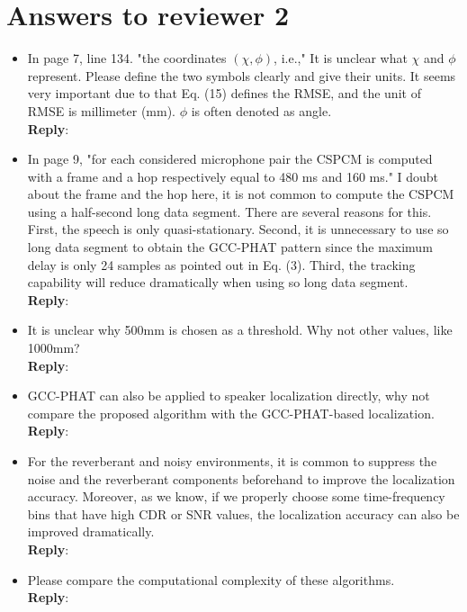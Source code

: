 \documentclass[11pt, technote, letterpaper, oneside, onecolumn]{IEEEtran}
\begin{document}
\section{Answers to reviewer 2}\label{sec:rev2}
\begin{itemize}
\item In page 7, line 134. "the coordinates $(\chi,\phi)$, i.e.," It is unclear what $\chi$ and $\phi$ represent. Please define the two symbols clearly and give their units. It seems very important due to that Eq. (15) defines the RMSE, and the unit of RMSE is millimeter (mm). $\phi$ is often denoted as angle.\\
\textbf{Reply}:
\item  In page 9, "for each considered microphone pair the CSPCM is computed with a frame and a hop respectively equal to 480 ms and 160 ms." I doubt about the frame and the hop here, it is not common to compute the CSPCM using a half-second long data segment. There are several reasons for this. First, the speech is only quasi-stationary. Second, it is unnecessary to use so long data segment to obtain the GCC-PHAT pattern since the maximum delay is only 24 samples as pointed out in Eq. (3). Third, the tracking capability will reduce dramatically when using so long data segment.\\
\textbf{Reply}:
\item  It is unclear why 500mm is chosen as a threshold. Why not other values, like 1000mm?\\
\textbf{Reply}:
\item  GCC-PHAT can also be applied to speaker localization directly, why not compare the proposed algorithm with the GCC-PHAT-based localization. \\
\textbf{Reply}:
\item  For the reverberant and noisy environments, it is common to suppress the noise and the reverberant components beforehand to improve the localization accuracy. Moreover, as we know, if we properly choose some time-frequency bins that have high CDR or SNR values, the localization accuracy can also be improved dramatically.\\
\textbf{Reply}:

\item  Please compare the computational complexity of these algorithms.\\
\textbf{Reply}:

\end{itemize}
\end{document}
